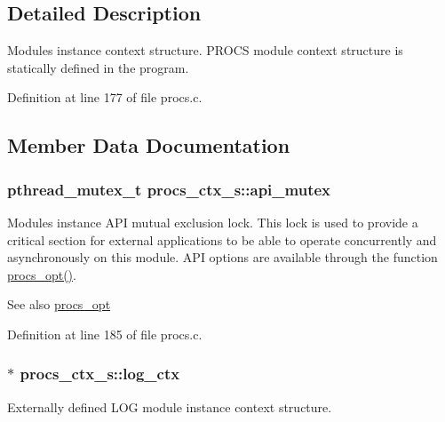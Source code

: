 \subsection{Detailed Description}
Module\textquotesingle{}s instance context structure. P\+R\+O\+CS module context structure is statically defined in the program. 

Definition at line 177 of file procs.\+c.



\subsection{Member Data Documentation}
\subsubsection[{\texorpdfstring{api\+\_\+mutex}{api_mutex}}]{\setlength{\rightskip}{0pt plus 5cm}pthread\+\_\+mutex\+\_\+t procs\+\_\+ctx\+\_\+s\+::api\+\_\+mutex}\hypertarget{structprocs__ctx__s_a27330c986436226abfa1b5a00b7bdeb1}{}\label{structprocs__ctx__s_a27330c986436226abfa1b5a00b7bdeb1}
Module\textquotesingle{}s instance A\+PI mutual exclusion lock. This lock is used to provide a critical section for external applications to be able to operate concurrently and asynchronously on this module. A\+PI options are available through the function \hyperlink{procs_8c_a7af2e6f2788006cfc96ca8d811922ffa}{procs\+\_\+opt()}. \begin{DoxySeeAlso}{See also}
\hyperlink{procs_8h_a7af2e6f2788006cfc96ca8d811922ffa}{procs\+\_\+opt} 
\end{DoxySeeAlso}


Definition at line 185 of file procs.\+c.

\subsubsection[{\texorpdfstring{log\+\_\+ctx}{log_ctx}}]{$\ast$ procs\+\_\+ctx\+\_\+s\+::log\+\_\+ctx}\hypertarget{structprocs__ctx__s_ab5d529e82924052baf26478afca901fa}{}\label{structprocs__ctx__s_ab5d529e82924052baf26478afca901fa}
Externally defined L\+OG module instance context structure. 

